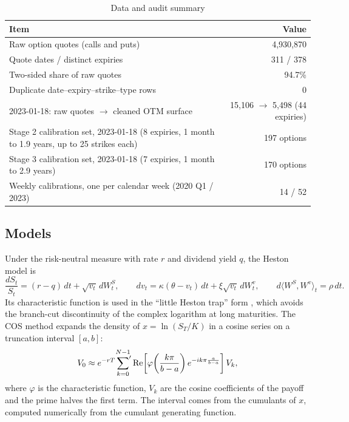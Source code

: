 \documentclass[10pt,letterpaper]{article}
\begin{document}
\begin{table}[H]
\caption{Data and audit summary}
\small
\begin{tabularx}{\textwidth}{Xr}
\toprule
\textbf{Item} & \textbf{Value}\\
\midrule
Raw option quotes (calls and puts) & 4,930,870\\
Quote dates / distinct expiries & 311 / 378\\
Two-sided share of raw quotes & 94.7\%\\
Duplicate date--expiry--strike--type rows & 0\\
2023-01-18: raw quotes $\rightarrow$ cleaned OTM surface & 15,106 $\rightarrow$ 5,498 (44 expiries)\\
Stage 2 calibration set, 2023-01-18 (8 expiries, 1 month to 1.9 years, up to 25 strikes each) & 197 options\\
Stage 3 calibration set, 2023-01-18 (7 expiries, 1 month to 2.9 years) & 170 options\\
Weekly calibrations, one per calendar week (2020 Q1 / 2023) & 14 / 52\\
\bottomrule
\end{tabularx}
\end{table}

\subsection{Models}
Under the risk-neutral measure with rate $r$ and dividend yield $q$, the Heston model is
\begin{equation}
\frac{dS_t}{S_t} = (r-q)\,dt + \sqrt{v_t}\,dW^S_t,\qquad
dv_t = \kappa(\theta - v_t)\,dt + \xi\sqrt{v_t}\,dW^v_t,\qquad d\langle W^S,W^v\rangle_t = \rho\,dt .
\end{equation}
Its characteristic function is used in the ``little Heston trap'' form \citep{albrecher2007}, which avoids the
branch-cut discontinuity of the complex logarithm at long maturities. The COS method \citep{fang2008} expands the
density of $x=\ln(S_T/K)$ in a cosine series on a truncation interval $[a,b]$:
\begin{equation}
V_0 \approx e^{-rT}\sideset{}{'}\sum_{k=0}^{N-1}\operatorname{Re}\!\left[\varphi\!\left(\frac{k\pi}{b-a}\right)
e^{-ik\pi\frac{a}{b-a}}\right] V_k ,
\end{equation}
where $\varphi$ is the characteristic function, $V_k$ are the cosine coefficients of the payoff and the prime halves
the first term. The interval comes from the cumulants of $x$, computed numerically from the cumulant generating
function.
\end{document}
